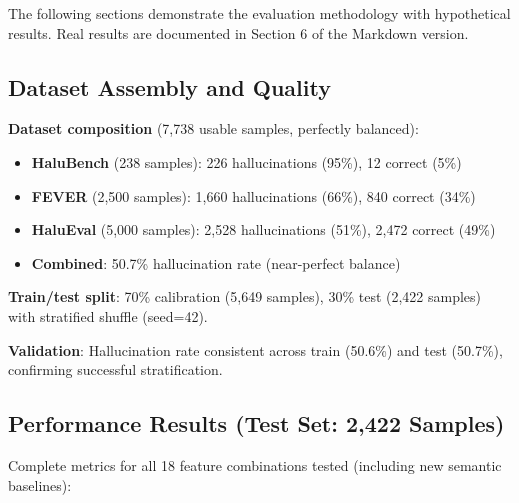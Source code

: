 \documentclass[11pt]{article}
\begin{document}
The following sections demonstrate the evaluation methodology with hypothetical results. Real results are documented in Section 6 of the Markdown version.

\subsection{Dataset Assembly and Quality}

\textbf{Dataset composition} (7,738 usable samples, perfectly balanced):
\begin{itemize}
\item \textbf{HaluBench} (238 samples): 226 hallucinations (95\%), 12 correct (5\%)
\item \textbf{FEVER} (2,500 samples): 1,660 hallucinations (66\%), 840 correct (34\%)
\item \textbf{HaluEval} (5,000 samples): 2,528 hallucinations (51\%), 2,472 correct (49\%)
\item \textbf{Combined}: 50.7\% hallucination rate (near-perfect balance)
\end{itemize}

\textbf{Train/test split}: 70\% calibration (5,649 samples), 30\% test (2,422 samples) with stratified shuffle (seed=42).

\textbf{Validation}: Hallucination rate consistent across train (50.6\%) and test (50.7\%), confirming successful stratification.

\subsection{Performance Results (Test Set: 2,422 Samples)}

Complete metrics for all 18 feature combinations tested (including new semantic baselines):
\end{document}
